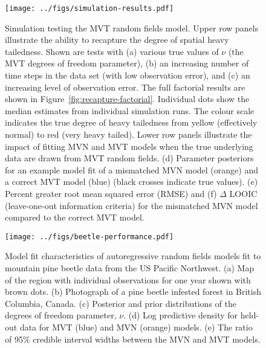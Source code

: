 \documentclass[12pt,english]{article}
\begin{document}
\begin{spacing}{1.9}
\begin{figure}[htb]
  \begin{center}
    \texttt{[image: ../figs/simulation-results.pdf]}
    \caption{Simulation testing the MVT random fields model.
      Upper row
      panels illustrate the ability to recapture the
      degree of spatial heavy tailedness.
      Shown are tests with
      (a) various true values of $\nu$ (the MVT degrees of freedom parameter),
      (b) an increasing number of time steps in the data set (with low observation error),
      and (c) an increasing level of observation error.
      The full factorial results are shown in Figure~\ref{fig:recapture-factorial}.
      Individual dots show the median estimates from individual simulation runs.
      The colour scale indicates the true degree of heavy tailedness from
      yellow (effectively normal) to red (very heavy tailed).
      Lower row panels illustrate the impact of fitting MVN and MVT models
      when the true underlying data are drawn from MVT random fields.
      (d) Parameter posteriors for an
      example model fit of a mismatched MVN model (orange)
      and a correct MVT model (blue) (black crosses indicate true values).
      (e) Percent greater root mean squared error (RMSE)
      and (f) $\Delta$ LOOIC (leave-one-out information criteria)
      for the mismatched MVN model compared to the correct MVT model.
    }
    \label{fig:recapture}
  \end{center}
\end{figure}

\begin{figure}[htb]
  \begin{center}
    \texttt{[image: ../figs/beetle-performance.pdf]}
    \caption{
      Model fit characteristics of autoregressive random fields
      models fit to mountain pine beetle data from the US Pacific Northwest.
      (a) Map of the region with individual observations for one year shown with
      brown dots.
      (b) Photograph of a pine beetle infested forest in British Columbia, Canada.
      (c) Posterior and prior distributions of the degrees of freedom parameter, $\nu$.
      (d) Log predictive density for held-out data for MVT (blue) and MVN (orange) models.
      (e) The ratio of 95\% credible interval widths between the MVN and MVT models.
    }
    \label{fig:map-etc}
  \end{center}
\end{figure}


\end{spacing}
\end{document}
